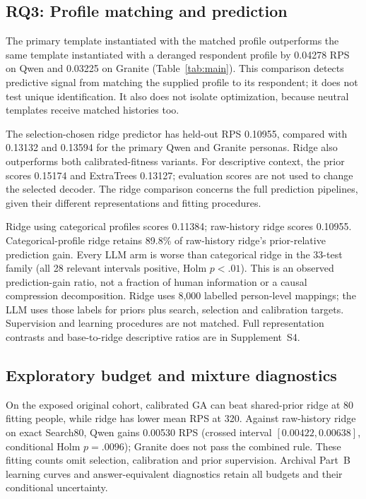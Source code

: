 \documentclass[10pt,twocolumn]{article}
\newcommand{\ArchivalApp}{Supplement~S4}
\begin{document}
\subsection{RQ3: Profile matching and prediction}
The primary template instantiated with the matched profile outperforms
the same template instantiated with a deranged respondent profile by 0.04278 RPS on Qwen and 0.03225 on Granite (Table~\ref{tab:main}).
This comparison detects predictive signal from matching the supplied profile
to its respondent; it does not test unique identification. It also does not
isolate optimization, because neutral templates receive matched histories too.

The selection-chosen ridge predictor has held-out RPS 0.10955, compared with
0.13132 and 0.13594 for the primary Qwen and Granite personas. Ridge also
outperforms both calibrated-fitness variants. For descriptive context, the
prior scores 0.15174 and ExtraTrees 0.13127; evaluation scores are not used
to change the selected decoder. The ridge comparison concerns the full
prediction pipelines, given their different representations and fitting
procedures.

Ridge using categorical profiles scores 0.11384; raw-history ridge scores
0.10955. Categorical-profile ridge retains 89.8\% of raw-history ridge's
prior-relative prediction gain. Every LLM arm is
worse than categorical ridge in the 33-test family (all 28 relevant intervals
positive, Holm $p<.01$). This is an observed prediction-gain ratio, not a
fraction of human information or a causal compression decomposition.
Ridge uses 8,000 labelled person-level mappings; the LLM uses those labels
for priors plus search, selection and calibration targets. Supervision and
learning procedures are not matched. Full representation contrasts and
base-to-ridge descriptive ratios are in \ArchivalApp.

\subsection{Exploratory budget and mixture diagnostics}
On the exposed original cohort, calibrated GA can beat shared-prior ridge
at 80 fitting people, while ridge has lower mean RPS at 320. Against
raw-history ridge on exact Search80, Qwen gains 0.00530 RPS (crossed interval
$[0.00422,0.00638]$, conditional Holm $p=.0096$); Granite does not pass the
combined rule. These fitting counts omit selection, calibration and prior
supervision. Archival Part~B learning curves and answer-equivalent diagnostics
retain all budgets and their conditional uncertainty.
\end{document}
